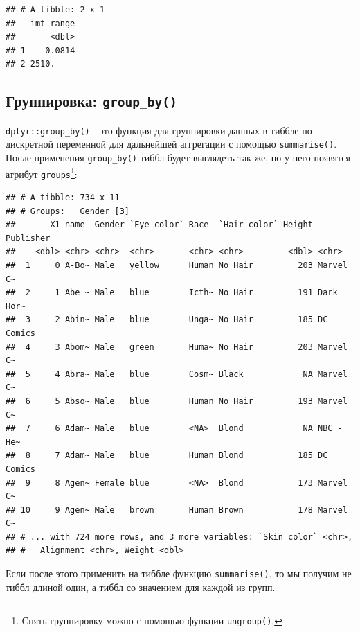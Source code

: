 \documentclass[
]{book}
\newenvironment{Shaded}{\begin{snugshade}}{\end{snugshade}}
\newcommand{\KeywordTok}[1]{\textcolor[rgb]{0.13,0.29,0.53}{\textbf{#1}}}
\newcommand{\NormalTok}[1]{#1}
\newcommand{\OperatorTok}[1]{\textcolor[rgb]{0.81,0.36,0.00}{\textbf{#1}}}
\newcommand{\StringTok}[1]{\textcolor[rgb]{0.31,0.60,0.02}{#1}}
\begin{document}
\begin{verbatim}
## # A tibble: 2 x 1
##   imt_range
##       <dbl>
## 1    0.0814
## 2 2510.
\end{verbatim}

\hypertarget{tidy_group}{%
\subsection{\texorpdfstring{Группировка: \texttt{group\_by()}}{Группировка: group\_by()}}\label{tidy_group}}

\texttt{dplyr::group\_by()} - это функция для группировки данных в тиббле по дискретной переменной для дальнейшей аггрегации с помощью \texttt{summarise()}. После применения \texttt{group\_by()} тиббл будет выглядеть так же, но у него появятся атрибут \texttt{groups}\footnote{Снять группировку можно с помощью функции \texttt{ungroup()}.}:

\begin{Shaded}
\end{Shaded}

\begin{verbatim}
## # A tibble: 734 x 11
## # Groups:   Gender [3]
##       X1 name  Gender `Eye color` Race  `Hair color` Height Publisher
##    <dbl> <chr> <chr>  <chr>       <chr> <chr>         <dbl> <chr>    
##  1     0 A-Bo~ Male   yellow      Human No Hair         203 Marvel C~
##  2     1 Abe ~ Male   blue        Icth~ No Hair         191 Dark Hor~
##  3     2 Abin~ Male   blue        Unga~ No Hair         185 DC Comics
##  4     3 Abom~ Male   green       Huma~ No Hair         203 Marvel C~
##  5     4 Abra~ Male   blue        Cosm~ Black            NA Marvel C~
##  6     5 Abso~ Male   blue        Human No Hair         193 Marvel C~
##  7     6 Adam~ Male   blue        <NA>  Blond            NA NBC - He~
##  8     7 Adam~ Male   blue        Human Blond           185 DC Comics
##  9     8 Agen~ Female blue        <NA>  Blond           173 Marvel C~
## 10     9 Agen~ Male   brown       Human Brown           178 Marvel C~
## # ... with 724 more rows, and 3 more variables: `Skin color` <chr>,
## #   Alignment <chr>, Weight <dbl>
\end{verbatim}

Если после этого применить на тиббле функцию \texttt{summarise()}, то мы получим не тиббл длиной один, а тиббл со значением для каждой из групп.
\end{document}
